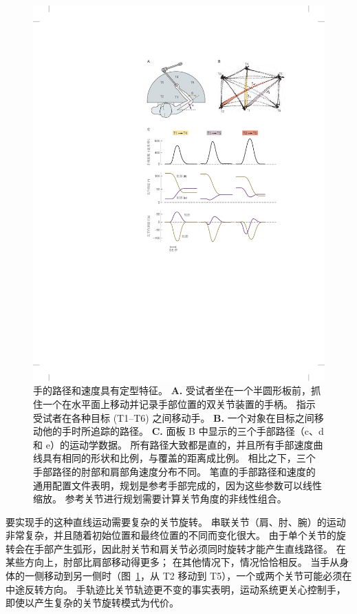 \begin{figure}[htbp]
	\centering
	\includegraphics[width=0.9\linewidth]{chap30/fig_30_8}
	\caption{手的路径和速度具有定型特征\cite{morasso1981spatial}。
		\textbf{A.} 受试者坐在一个半圆形板前，抓住一个在水平面上移动并记录手部位置的双关节装置的手柄。
		指示受试者在各种目标 (T1–T6) 之间移动手。
		\textbf{B.} 一个对象在目标之间移动他的手时所追踪的路径。
		\textbf{C.} 面板 B 中显示的三个手部路径（c、d 和 e）的运动学数据。
		所有路径大致都是直的，并且所有手部速度曲线具有相同的形状和比例，与覆盖的距离成比例。
		相比之下，三个手部路径的肘部和肩部角速度分布不同。
		笔直的手部路径和速度的通用配置文件表明，规划是参考手部完成的，因为这些参数可以线性缩放。
		参考关节进行规划需要计算关节角度的非线性组合。}
	\label{fig:30_8}
\end{figure}


要实现手的这种直线运动需要复杂的关节旋转。
串联关节（肩、肘、腕）的运动非常复杂，并且随着初始位置和最终位置的不同而变化很大。
由于单个关节的旋转会在手部产生弧形，因此肘关节和肩关节必须同时旋转才能产生直线路径。
在某些方向上，肘部比肩部移动得更多；
在其他情况下，情况恰恰相反。
当手从身体的一侧移动到另一侧时（图~\ref{fig:30_8}，从 T2 移动到 T5），一个或两个关节可能必须在中途反转方向。
手轨迹比关节轨迹更不变的事实表明，运动系统更关心控制手，即使以产生复杂的关节旋转模式为代价。


